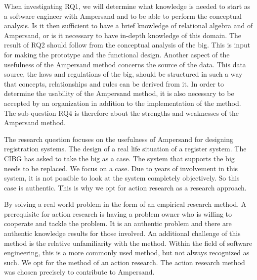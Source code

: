 When investigating RQ1, we will determine what knowledge is needed to start as a software engineer with Ampersand and to be able to perform the conceptual analysis.
Is it then sufficient to have a brief knowledge of relational algebra and of Ampersand, or is it necessary to have in-depth knowledge of this domain.
The result of RQ2 should follow from the conceptual analysis of the \acrshort{big}.
This is input for making the prototype and the functional design.
Another aspect of the usefulness of the Ampersand method concerns the source of the data.
This data source, the laws and regulations of the \acrshort{big}, should be structured in such a way that concepts, relationships and rules can be derived from it.
In order to determine the usability of the Ampersand method, it is also necessary to be accepted by an organization in addition to the implementation of the method.
The sub-question RQ4 is therefore about the strengths and weaknesses of the Ampersand method.



\begin{comment}
\item[RQ1]- What knowledge is necessary for using Ampersand.
\item[RQ2]- What are the concepts and relationships in the new law big.
\item[RQ3]- Are the results useful for the CIBG organization.
\item[RQ4]- Is the description of the legislation and regulations, set up in such a way that this legislation can be used for the Ampersand method.
\end{comment}


The research question focuses on the usefulness of Ampersand for designing registration systems.
The design of a real life situation of a register system.
The CIBG has asked to take the \acrshort{big} as a case.
The system that supports the \acrshort{big} needs to be replaced.
We focus on a case.
Due to years of involvement in this system, it is not possible to look at the system completely objectively.
So this case is authentic.
This is why we opt for action research as a research approach.

By solving a real world problem in the form of an empirical research method.
A prerequisite for action research is having a problem owner who is willing to cooperate and tackle the problem.
It is an authentic problem and there are authentic knowledge results for those involved.
An additional challenge of this method is the relative unfamiliarity with the method.
Within the field of software engineering, this is a more commonly used method, but not always recognized as such.
We opt for the method of an action research.
The action research\citep{Easterbrook} method was chosen precisely to contribute to Ampersand.

